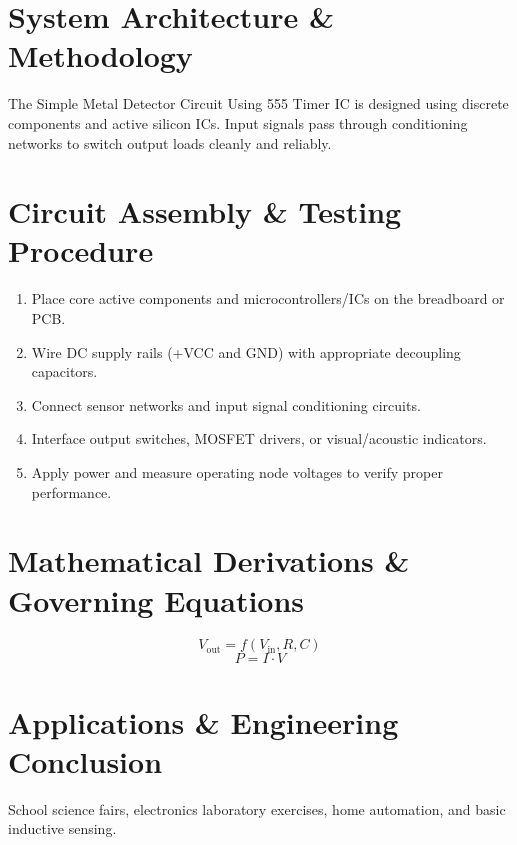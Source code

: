 \documentclass[11pt,a4paper]{article}
\begin{document}
\section{System Architecture \& Methodology}
The Simple Metal Detector Circuit Using 555 Timer IC is designed using discrete components and active silicon ICs. Input signals pass through conditioning networks to switch output loads cleanly and reliably.

\section{Circuit Assembly \& Testing Procedure}
\begin{enumerate}
    \item Place core active components and microcontrollers/ICs on the breadboard or PCB.
    \item Wire DC supply rails (+VCC and GND) with appropriate decoupling capacitors.
    \item Connect sensor networks and input signal conditioning circuits.
    \item Interface output switches, MOSFET drivers, or visual/acoustic indicators.
    \item Apply power and measure operating node voltages to verify proper performance.
\end{enumerate}

\section{Mathematical Derivations \& Governing Equations}
\begin{equation}
V_{\text{out}} = f(V_{\text{in}}, R, C)
\end{equation}
\begin{equation}
P = I \cdot V
\end{equation}

\section{Applications \& Engineering Conclusion}
School science fairs, electronics laboratory exercises, home automation, and basic inductive sensing.
\end{document}
